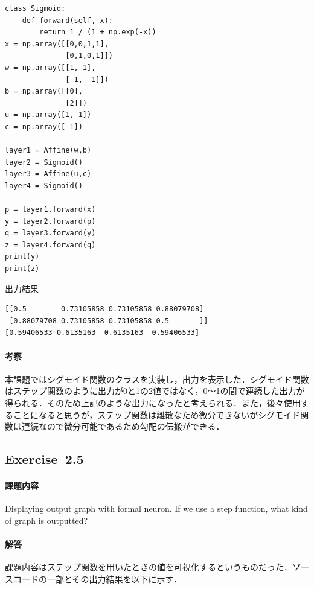 \documentclass[11pt, a4paper]{jsarticle}
\begin{document}
  \begin{lstlisting}[caption=Exercise~2.4, label=src:exercise2.4]
class Sigmoid:
    def forward(self, x):
        return 1 / (1 + np.exp(-x))
x = np.array([[0,0,1,1],
              [0,1,0,1]])
w = np.array([[1, 1],
              [-1, -1]])
b = np.array([[0],
              [2]])
u = np.array([1, 1])
c = np.array([-1])

layer1 = Affine(w,b)
layer2 = Sigmoid()
layer3 = Affine(u,c)
layer4 = Sigmoid()

p = layer1.forward(x)
y = layer2.forward(p)
q = layer3.forward(y)
z = layer4.forward(q)
print(y)
print(z)
  \end{lstlisting}

  \begin{itembox}[l]{出力結果}
    \begin{verbatim}
[[0.5        0.73105858 0.73105858 0.88079708]
 [0.88079708 0.73105858 0.73105858 0.5       ]]
[0.59406533 0.6135163  0.6135163  0.59406533]
    \end{verbatim}
  \end{itembox}

  \paragraph{ 考察}
  本課題ではシグモイド関数のクラスを実装し，出力を表示した．シグモイド関数はステップ関数のように出力が0と1の2値ではなく，0～1の間で連続した出力が得られる．そのため上記のような出力になったと考えられる．また，後々使用することになると思うが，ステップ関数は離散なため微分できないがシグモイド関数は連続なので微分可能であるため勾配の伝搬ができる．

  \subsection{Exercise~2.5}
  \paragraph{ 課題内容}
  Displaying output graph with formal neuron. If we use a step function, what kind of graph is outputted?

  \paragraph{ 解答}
  課題内容はステップ関数を用いたときの値を可視化するというものだった．ソースコードの一部とその出力結果を以下に示す．
\end{document}
